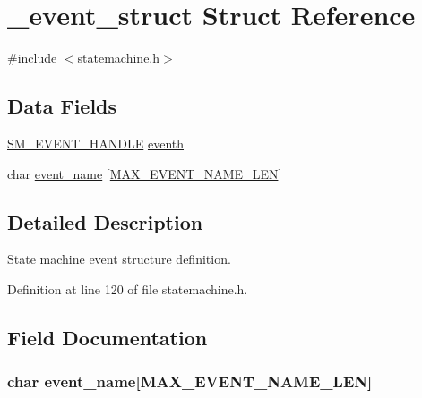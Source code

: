 \hypertarget{struct__event__struct}{\section{\-\_\-event\-\_\-struct Struct Reference}
\label{struct__event__struct}
}


{\ttfamily \#include $<$statemachine.\-h$>$}

\subsection*{Data Fields}
\begin{DoxyCompactItemize}
\item 
\hyperlink{statemachine_8h_acb17336d3c3a21ee8233cec54bb55b4f}{S\-M\-\_\-\-E\-V\-E\-N\-T\-\_\-\-H\-A\-N\-D\-L\-E} \hyperlink{struct__event__struct_a59bd332d34b2d67050865ea52c88bc47}{eventh}
\item 
char \hyperlink{struct__event__struct_a9e11699506045bb31dbda89f01d22d29}{event\-\_\-name} \mbox{[}\hyperlink{statemachine_8h_a59f77b5219f11ff706733185a1cb4124}{M\-A\-X\-\_\-\-E\-V\-E\-N\-T\-\_\-\-N\-A\-M\-E\-\_\-\-L\-E\-N}\mbox{]}
\end{DoxyCompactItemize}


\subsection{Detailed Description}
State machine event structure definition. 

Definition at line 120 of file statemachine.\-h.



\subsection{Field Documentation}
\hypertarget{struct__event__struct_a9e11699506045bb31dbda89f01d22d29}{
\subsubsection[{event\-\_\-name}]{\setlength{\rightskip}{0pt plus 5cm}char event\-\_\-name\mbox{[}{\bf M\-A\-X\-\_\-\-E\-V\-E\-N\-T\-\_\-\-N\-A\-M\-E\-\_\-\-L\-E\-N}\mbox{]}}}\label{struct__event__struct_a9e11699506045bb31dbda89f01d22d29}


